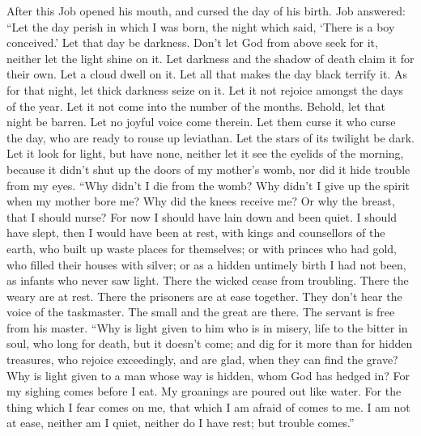  After this Job opened his mouth, and cursed the day of
his birth.  Job answered:  ``Let the day
perish in which I was born, the night which said, `There is a boy
conceived.'  Let that day be darkness. Don't let God from
above seek for it, neither let the light shine on it.  Let
darkness and the shadow of death claim it for their own. Let a cloud
dwell on it. Let all that makes the day black terrify it. 
As for that night, let thick darkness seize on it. Let it not rejoice
amongst the days of the year. Let it not come into the number of the
months.  Behold, let that night be barren. Let no joyful
voice come therein.  Let them curse it who curse the day,
who are ready to rouse up leviathan.  Let the stars of its
twilight be dark. Let it look for light, but have none, neither let it
see the eyelids of the morning,  because it didn't shut
up the doors of my mother's womb, nor did it hide trouble from my eyes.
 ``Why didn't I die from the womb? Why didn't I give up
the spirit when my mother bore me?  Why did the knees
receive me? Or why the breast, that I should nurse?  For
now I should have lain down and been quiet. I should have slept, then I
would have been at rest,  with kings and counsellors of
the earth, who built up waste places for themselves;  or
with princes who had gold, who filled their houses with silver;
 or as a hidden untimely birth I had not been, as infants
who never saw light.  There the wicked cease from
troubling. There the weary are at rest.  There the
prisoners are at ease together. They don't hear the voice of the
taskmaster.  The small and the great are there. The
servant is free from his master.  ``Why is light given to
him who is in misery, life to the bitter in soul,  who
long for death, but it doesn't come; and dig for it more than for hidden
treasures,  who rejoice exceedingly, and are glad, when
they can find the grave?  Why is light given to a man
whose way is hidden, whom God has hedged in?  For my
sighing comes before I eat. My groanings are poured out like water.
 For the thing which I fear comes on me, that which I am
afraid of comes to me.  I am not at ease, neither am I
quiet, neither do I have rest; but trouble comes.''

